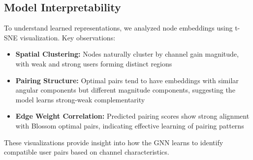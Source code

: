 \subsection{Model Interpretability}

To understand learned representations, we analyzed node embeddings using t-SNE visualization. Key observations:

\begin{itemize}
    \item \textbf{Spatial Clustering:} Nodes naturally cluster by channel gain magnitude, with weak and strong users forming distinct regions
    \item \textbf{Pairing Structure:} Optimal pairs tend to have embeddings with similar angular components but different magnitude components, suggesting the model learns strong-weak complementarity
    \item \textbf{Edge Weight Correlation:} Predicted pairing scores show strong alignment with Blossom optimal pairs, indicating effective learning of pairing patterns
\end{itemize}

These visualizations provide insight into how the GNN learns to identify compatible user pairs based on channel characteristics.
